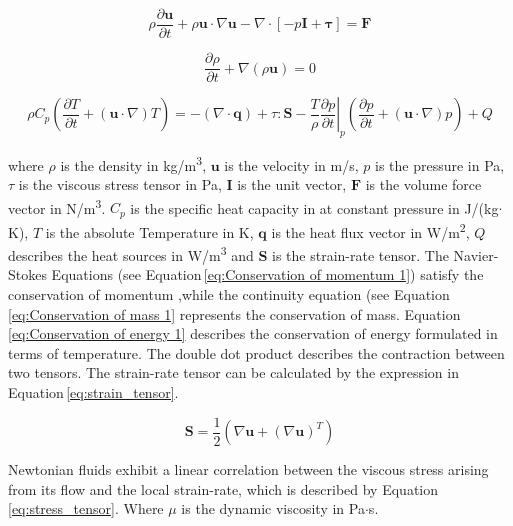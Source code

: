 \begin{equation}
\rho\frac{\partial \boldsymbol u}{\partial t} + \rho\boldsymbol u\cdotp\nabla\boldsymbol u - \nabla\cdotp[-p\boldsymbol I + \boldsymbol \tau] = \boldsymbol F
\label{eq:Conservation of momentum 1}
\end{equation}


\begin{equation}
\frac{\partial\rho}{\partial t}+\nabla(\rho\boldsymbol u) = 0
\label{eq:Conservation of mass 1}
\end{equation}

\begin{equation}
\rho C_{p}\left(\frac{\partial T}{\partial t}+(\boldsymbol u \cdotp\nabla)T\right) = -(\nabla\cdotp\boldsymbol q)+\tau:\boldsymbol S -\frac{T}{\rho}\left.\frac{\partial p}{\partial t}\right\vert_{p}\left(\frac{\partial p}{\partial t}+(\boldsymbol u\cdotp\nabla)p\right)+Q 
\label{eq:Conservation of energy 1}
\end{equation}

where $\rho$ is the density in kg/m\textsuperscript{3}, $\boldsymbol u$ is the velocity in m/s, $p$ is the pressure in Pa, $\tau$ is the viscous stress tensor in Pa, $\boldsymbol I$ is the unit vector, $\boldsymbol F$ is the volume force vector in N/m\textsuperscript{3}. $C_{p}$ is the specific heat capacity in at constant pressure in J/(kg$\cdotp$K), $T$ is the absolute Temperature in K, $\boldsymbol q$ is the heat flux vector in W/m\textsuperscript{2}, $Q$ describes the heat sources in W/m\textsuperscript{3} and $\boldsymbol S$ is the strain-rate tensor. The Navier-Stokes Equations (see Equation\,\ref{eq:Conservation of momentum 1}) satisfy the conservation of momentum ,while the continuity equation (see Equation\,\ref{eq:Conservation of mass 1} represents the conservation of mass. Equation\,\ref{eq:Conservation of energy 1} describes the conservation of energy formulated in terms of temperature. The double dot product describes the contraction between two tensors. The strain-rate tensor can be calculated by the expression in Equation\,\ref{eq:strain_tensor}.

\begin{equation}
\boldsymbol S = \frac{1}{2}(\nabla\boldsymbol u+(\nabla\boldsymbol u)^{T})
\label{eq:strain_tensor}
\end{equation}

Newtonian fluids exhibit a linear correlation between the viscous stress arising from its flow and the local strain-rate, which is described by Equation\,\ref{eq:stress_tensor}. Where $\mu$ is the dynamic viscosity in Pa$\cdotp$s.

